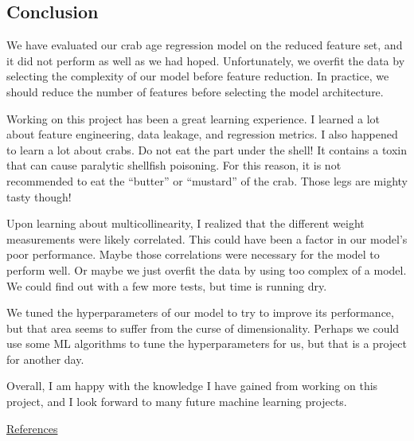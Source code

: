 \documentclass[11pt]{article}
\begin{document}
    \subsection{Conclusion}\label{conclusion}

We have evaluated our crab age regression model on the reduced feature
set, and it did not perform as well as we had hoped. Unfortunately, we
overfit the data by selecting the complexity of our model before feature
reduction. In practice, we should reduce the number of features before
selecting the model architecture.

Working on this project has been a great learning experience. I learned
a lot about feature engineering, data leakage, and regression metrics. I
also happened to learn a lot about crabs. Do not eat the part under the
shell! It contains a toxin that can cause paralytic shellfish poisoning.
For this reason, it is not recommended to eat the ``butter'' or
``mustard'' of the crab. Those legs are mighty tasty though!

Upon learning about multicollinearity, I realized that the different
weight measurements were likely correlated. This could have been a
factor in our model's poor performance. Maybe those correlations were
necessary for the model to perform well. Or maybe we just overfit the
data by using too complex of a model. We could find out with a few more
tests, but time is running dry.

We tuned the hyperparameters of our model to try to improve its
performance, but that area seems to suffer from the curse of
dimensionality. Perhaps we could use some ML algorithms to tune the
hyperparameters for us, but that is a project for another day.

Overall, I am happy with the knowledge I have gained from working on
this project, and I look forward to many future machine learning
projects.

\href{../refs.bib}{References}


    
    
    
\end{document}

